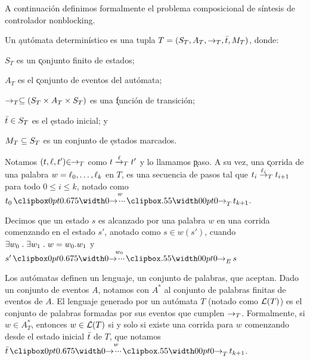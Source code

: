 A continuación definimos formalmente el problema composicional de síntesis de controlador nonblocking.

\begin{definition} \label{def:automata}
	Un \k{autómata determinístico} es una tupla $T = (S_T, A_T, \rightarrow_T, \bar{t}, M_T)$, donde:
	\begin{itemize*}[label=]
		
		\item $S_T$ es un \k{conjunto finito de estados};
		
		\item $A_T$ es el \k{conjunto de eventos} del autómata;
		
		\item $\rightarrow_T \subseteq (S_T \times A_T \times S_T)$ es una \k{función de transición};
		
		\item $\bar{t} \in S_T$ es el \k{estado inicial}; y
		
		\item $M_T \subseteq S_T$ es un conjunto de \k{estados marcados}.
		
	\end{itemize*}
	
\end{definition}

\begin{notation} \label{not:paso}
	
	$\!\!$Notamos $(t,\ell,t') {\in}\!\! \rightarrow_T$ como $t \overset{\ell}{\rightarrow}_{T} t'$ y lo llamamos \k{paso}.
	A su vez, una \k{corrida} de una palabra $w = \ell_0,\ldots,\ell_k$ en $T$, es una secuencia de pasos tal que $t_i \overset{\ell_i}{\rightarrow}_{T} t_{i+1}$ para todo $0 \leq i \leq k$, notado como $t_0 \runw{w}{T} t_{k+1}$.
	
\end{notation}


\begin{notation}
	Decimos que un estado $s$ es alcanzado por una palabra $w$ en una corrida comenzando en el estado $s'$, anotado como $s \in w(s')$, cuando $\exists w_0 \;.\; \exists w_1 \;.\; w = w_0.w_1$ 
	y $s' \runw{w_0}{E} s$
\end{notation}

Los autómatas definen un lenguaje, un conjunto de palabras, que aceptan. Dado un conjunto de eventos $A$, notamos con $A^*$ al conjunto de palabras finitas de eventos de $A$. El lenguaje generado por un autómata $T$ (notado como $\mathcal{L}(T)$) es el conjunto de palabras formadas por sus eventos que cumplen $\rightarrow_T$. Formalmente, si $w \in A_T^*$, entonces $w \in \mathcal{L}(T)$ si y solo si existe una corrida para $w$ comenzando desde el estado inicial $\bar{t}$ de $T$, que notamos $\init{t} \runw{w}{T} t_{k+1}$.

